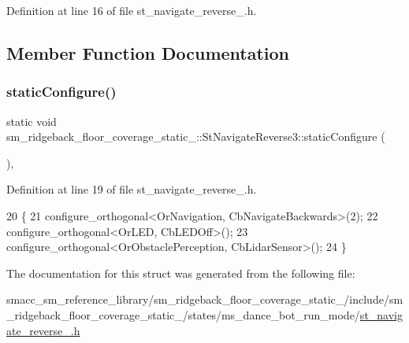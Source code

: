 Definition at line 16 of file st\+\_\+navigate\+\_\+reverse\+\_.\+h.



\subsection{Member Function Documentation}
\mbox{\label{structsm__ridgeback__floor__coverage__static__1_1_1StNavigateReverse3_a9eb3b774beb0ba424fdd05a50b5c005a}} 
\subsubsection{\texorpdfstring{static\+Configure()}{staticConfigure()}}
{\footnotesize\ttfamily static void sm\+\_\+ridgeback\+\_\+floor\+\_\+coverage\+\_\+static\+\_\+::\+St\+Navigate\+Reverse3\+::static\+Configure (\begin{DoxyParamCaption}{ }\end{DoxyParamCaption})\hspace{0.3cm}{\ttfamily [inline]}, {\ttfamily [static]}}



Definition at line 19 of file st\+\_\+navigate\+\_\+reverse\+\_.\+h.


\begin{DoxyCode}
20       \{
21          configure\_orthogonal<OrNavigation, CbNavigateBackwards>(2);
22          configure\_orthogonal<OrLED, CbLEDOff>();
23          configure\_orthogonal<OrObstaclePerception, CbLidarSensor>();
24       \}
\end{DoxyCode}


The documentation for this struct was generated from the following file\+:\begin{DoxyCompactItemize}
\item 
smacc\+\_\+sm\+\_\+reference\+\_\+library/sm\+\_\+ridgeback\+\_\+floor\+\_\+coverage\+\_\+static\+\_/include/sm\+\_\+ridgeback\+\_\+floor\+\_\+coverage\+\_\+static\+\_/states/ms\+\_\+dance\+\_\+bot\+\_\+run\+\_\+mode/\hyperlink{sm__ridgeback__floor__coverage__static__1_2include_2sm__ridgeback__floor__coverage__static__1_2s0f6d49f89d76935ff0e0654155fc4706}{st\+\_\+navigate\+\_\+reverse\+\_.\+h}\end{DoxyCompactItemize}
